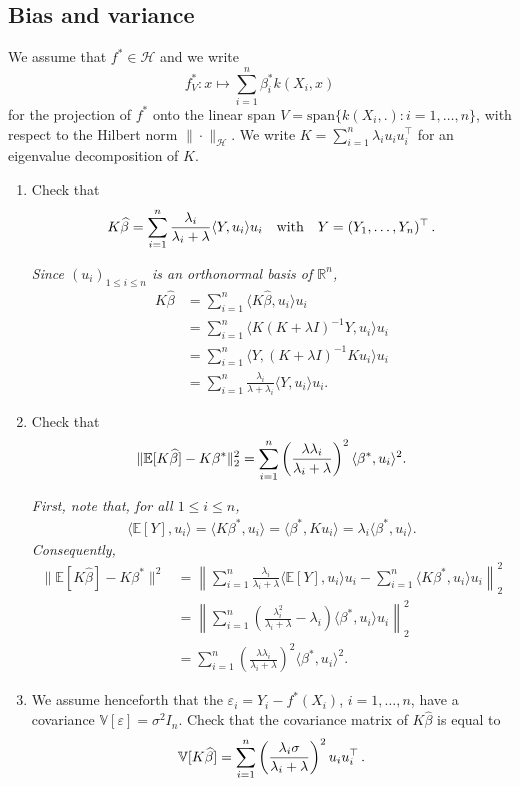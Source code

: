 \documentclass[a4paper,10pt,fleqn]{article}
\newcommand{\R}{\ensuremath{\mathbb{R}}}
\newcommand{\E}{\ensuremath{\mathbb{E}}}
\newcommand{\1}{\ensuremath{\mathbbm{1}}}
\begin{document}
\subsection*{Bias and variance}
We assume that $f^*\in\mathcal{H}$ and we write 
$$f^*_{V}: x \mapsto \sum_{i=1}^n \beta_{i}^*k(X_{i},x)$$ 
for the projection of $f^*$ onto the linear span $V=\textrm{span}\{k(X_{i},.): i=1,\ldots,n\}$, with respect to the Hilbert norm $\|\cdot\|_{\mathcal{H}}$. We write $K=\sum_{i=1}^n \lambda_{i}u_{i}u_{i}^\top$ for an eigenvalue decomposition of $K$.
\begin{enumerate}
	\item Check that 
	$$K\widehat \beta= \sum_{i=1}^n {\lambda_{i}\over \lambda_{i}+\lambda} \langle Y, u_{i}\rangle u_{i}\quad\textrm{with}\quad Y=(Y_{1},\ldots,Y_{n})^\top\,.$$

\vspace{.2cm}

{\em
Since $(u_i)_{1 \leq i \leq n}$ is an orthonormal basis of $\R^n$,   
		\begin{align*}
			K \widehat{\beta} & = \sum_{i=1}^n \langle K \widehat{\beta}, u_i\rangle u_i\\
			& = \sum_{i=1}^n \langle K (K+\lambda I)^{-1}Y, u_i\rangle u_i\\
			& = \sum_{i=1}^n \langle Y, (K+\lambda I)^{-1} K  u_i\rangle u_i\\
			& = \sum_{i=1}^n \frac{\lambda_i }{\lambda + \lambda_i} \langle Y, u_i \rangle u_i.
		\end{align*}
}
	\item Check that
	$$\|\E[K\widehat \beta]-K\beta^*\|_2^2=\sum_{i=1}^n \left( \lambda\lambda_{i}\over \lambda_{i}+\lambda\right)^2 \langle \beta^*, u_{i}\rangle^2.$$

\vspace{.2cm}

{\em
First, note that, for all $1 \leq i \leq n$, 
		\begin{align*}
			\langle \E [Y], u_i \rangle  = \langle K \beta^* , u_i\rangle 
			= \langle \beta^* , K u_i\rangle = \lambda_i \langle \beta^* , u_i\rangle.
		\end{align*}
		Consequently, 
		\begin{align*}
			\| \E [K \widehat{\beta}] - K \beta^* \|^2 
			& = \left\| \sum_{i=1}^n \frac{\lambda_i}{\lambda_i + \lambda} \langle \E [Y], u_i \rangle u_i - \sum_{i=1}^n \langle K \beta^*, u_i \rangle u_i  \right\|_2^2 \\
			& = \left\| \sum_{i=1}^n \left( \frac{\lambda_i^2}{\lambda_i + \lambda} - \lambda_i \right)  \langle \beta^*, u_i \rangle u_i \right\|_2^2 \\
			& = \sum_{i=1}^n \left( \frac{\lambda \lambda_i }{\lambda_i + \lambda}\right)^2 \langle \beta^*, u_i \rangle^2.
		\end{align*}
}
	\item We assume henceforth that the $\varepsilon_{i}=Y_{i}-f^*(X_{i})$, $i=1,\ldots,n$, have a covariance $\mathbb{V}[\varepsilon]=\sigma^2I_{n}$.
	Check that the covariance matrix of $K\widehat \beta$ is equal to
	$$\mathbb{V}[K\widehat \beta]=\sum_{i=1}^n \left(\lambda_{i}\sigma\over \lambda_{i}+\lambda\right)^2u_{i}u_{i}^\top\,.$$


\end{enumerate}
\end{document}
